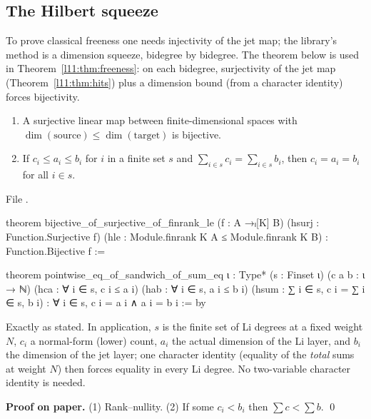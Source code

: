 \subsection{The Hilbert squeeze}

To prove classical freeness one needs injectivity of the jet map; the library's method is a dimension squeeze,
bidegree by bidegree. The theorem below is used in Theorem~\ref{l11:thm:freeness}: on each bidegree, surjectivity of the jet map
(Theorem~\ref{l11:thm:hits}) plus a dimension bound (from a character identity) forces bijectivity.

\begin{theorem}\label{l11:thm:squeeze}
\begin{enumerate}
\item A surjective linear map between finite-dimensional spaces with $\dim(\text{source})\le\dim(\text{target})$ is
  bijective.
\item If $c_i\le a_i\le b_i$ for $i$ in a finite set $s$ and $\sum_{i\in s}c_i = \sum_{i\in s}b_i$, then $c_i = a_i = b_i$
  for all $i\in s$.
\end{enumerate}
\end{theorem}
\noindent File .
\begin{leancode}
theorem bijective_of_surjective_of_finrank_le
    (f : A →ₗ[K] B) (hsurj : Function.Surjective f)
    (hle : Module.finrank K A ≤ Module.finrank K B) :
    Function.Bijective f :=

theorem pointwise_eq_of_sandwich_of_sum_eq {ι : Type*} (s : Finset ι)
    (c a b : ι → ℕ)
    (hca : ∀ i ∈ s, c i ≤ a i) (hab : ∀ i ∈ s, a i ≤ b i)
    (hsum : ∑ i ∈ s, c i = ∑ i ∈ s, b i) :
    ∀ i ∈ s, c i = a i ∧ a i = b i := by
\end{leancode}

\begin{dictionary}
Exactly as stated. In application, $s$ is the finite set of Li degrees at a fixed weight $N$, $c_i$ a normal-form
(lower) count, $a_i$ the actual dimension of the Li layer, and $b_i$ the dimension of the jet layer; one character
identity (equality of the \emph{total} sums at weight $N$) then forces equality in every Li degree. No two-variable
character identity is needed.
\end{dictionary}

\textbf{Proof on paper.} (1) Rank--nullity. (2) If some $c_i<b_i$ then $\sum c<\sum b$. \qed

